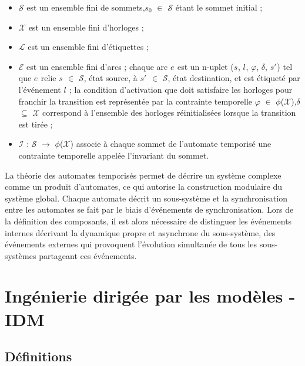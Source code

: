 \documentclass[french]{spimufcphdthesis}
\begin{document}
\begin{itemize}
\item  $\mathcal{S}$ est un ensemble fini de sommets,$s_{0}$ 
$\mathcal{\in}$  $\mathcal{S}$ étant le sommet initial ;

\item  $\mathcal{X}$ est un ensemble fini d’horloges ;

\item  $\mathcal{L}$ est un ensemble fini d’étiquettes ;

\item  $\mathcal{E}$ est un ensemble fini d’arcs ; chaque arc
$e_{ }$ est un n-uplet ($s_{ }$, $l_{ }$, $\varphi$, $\delta$, $s'_{ }$) tel que $e_{ }$ relie $s_{ }$ $\mathcal{\in}$  $\mathcal{S}$, état source, à $s'_{ }$ $\mathcal{\in}$  $\mathcal{S}$, état destination, et est étiqueté par l’événement $l_{ }$ ;
la condition d’activation que doit satisfaire les horloges pour franchir la transition est représentée par la contrainte temporelle $\varphi$ $\mathcal{\in}$ $\mathcal{\phi}$($\mathcal{X}$),$\delta$ $\subseteq$ $\mathcal{X}$ correspond à l’ensemble des horloges réinitialisées lorsque la transition est tirée ;

\item $\mathcal{I}$ : $\mathcal{S}$ $\rightarrow$ $\mathcal{\phi}$($\mathcal{X}$) associe à chaque sommet de l’automate temporisé une contrainte temporelle appelée l’invariant du sommet.

\end{itemize}

 La théorie des automates temporisés permet de décrire un système complexe comme un produit d’automates, ce qui autorise la construction modulaire du système global. Chaque automate décrit un sous-système et la synchronisation entre les automates se fait par le biais d’événements de synchronisation. Lors de la définition des composants, il est alors nécessaire de distinguer les événements internes décrivant la dynamique propre et asynchrone du sous-système, des événements externes qui provoquent l’évolution simultanée de tous les sous-systèmes partageant ces événements.


\section{Ingénierie dirigée par les modèles - IDM}
\subsection{Définitions}
\end{document}
